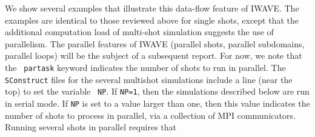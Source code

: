 We show several examples that illustrate this data-flow feature of
IWAVE. The examples are identical to those reviewed above for single
shots, except that the additional computation load of multi-shot
simulation suggests the use of parallelism. The parallel features of
IWAVE (parallel shots, parallel subdomains, parallel loops) will be
the subject of a subsequent report. For now, we note that the {\tt
  partask} keyword indicates the number of shots to run in
parallel. The {\tt SConstruct} files for the several multishot
simulations include a line (near the top) to set the variable {\tt
  NP}. If {\tt NP=1}, then the simulations described below are run in
serial  mode. If {\tt NP} is set to a value larger than one, then this value
indicates the number of shots to process in parallel, via a collection
of MPI communicators. Running several shots in parallel requires that
